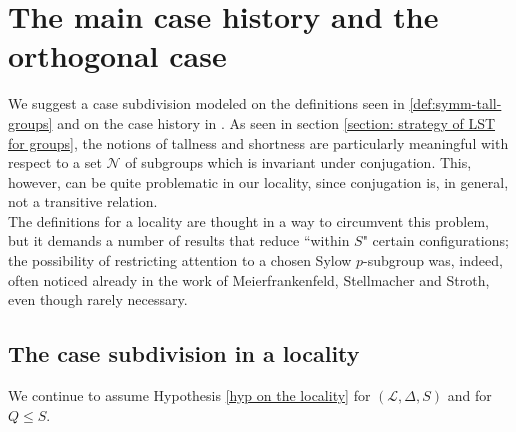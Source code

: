 \documentclass{amsart}
\numberwithin{equation}{section}
\theoremstyle{definition}
\theoremstyle{subresult}
\theoremstyle{caseresult}
\newcommand{\N}{\mathcal{N}}
\renewcommand{\L}{\mathcal{L}}
\newcommand{\<}{\langle}
\renewcommand{\>}{\rangle}
\begin{document}
\section{The main case history and the orthogonal case}
\label{case history and orthog case}

We suggest a case subdivision modeled on the definitions seen in \ref{def:symm-tall-groups} and on the case history in \cite{Meier-Stell-Stroth:2012}. As seen in section \ref{section: strategy of LST for groups}, the notions of tallness and shortness are particularly meaningful with respect to a set $\N$ of subgroups which is invariant under conjugation. This, however, can be quite problematic in our locality, since conjugation is, in general, not a transitive relation.\\
The definitions for a locality are thought in a way to circumvent this problem, but it demands a number of results that reduce ``within $S$" certain configurations; the possibility of restricting attention to a chosen Sylow $p$-subgroup was, indeed, often noticed already in the work of Meierfrankenfeld, Stellmacher and Stroth, even though rarely necessary.\\

\subsection{The case subdivision in a locality}

We continue to assume Hypothesis \ref{hyp on the locality} for $(\L,\Delta,S) $ and for $Q \le S$.
\end{document}
